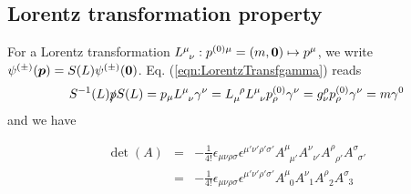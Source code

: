 \begin{comment}
\\
\tr ( \gamma^{\mu_1} \gamma^{\mu_2} \cdots \gamma^{\mu_{2n}} )
&=
2g^{\mu_1 \mu_2} \tr ( \gamma^{\mu_3} \cdots \gamma^{\mu_{2n}} )
-
\tr ( \gamma^{\mu_2} \gamma^{\mu_1}  \gamma^{\mu_3} \cdots \gamma^{\mu_{2n}} )
\\
&=
2g^{12} \tr(3 \cdots 2n) 
-
2g^{13} \tr(2\cdot 4 \cdots 2n)
+
\tr ( 2 \cdot 3 \cdot 1 \cdot 4 \cdots 2n )
\\
&\cdots
\\
&=
\sum_{i = 2}^{2n} (-1)^i 2g^{1i} \tr( 2\cdots \xcancel{i} \cdots 2n)
+(-1)^{2n -1} \tr ( 2 \cdots 2n \cdot 1)
\\
&=
\sum_{i = 2}^{2n} (-1)^i g^{\mu_1 \mu_i} 
\tr( \gamma^{\mu_2} \cdots \xcancel{\gamma^{\mu_i}} \cdots \gamma^{\mu_{2n}})

\end{comment}


\bigskip
\noindent
\subsection{Lorentz transformation property}
\label{sec:AppDirac_LorentzTransf}

For a Lorentz transformation $L^\mu_{\;\;\nu}: p^{(0)\mu} = (m, \mbox{\boldmath $0$}) \mapsto p^\mu$, we write
$\psi^{(\pm)}(\mbox{\boldmath $p$}) = S(L) \psi^{(\pm)}(\mbox{\boldmath $0$})$.
Eq. (\ref{eqn:LorentzTransfgamma}) reads
\begin{eqnarray*}
S^{-1}(L) \slashed{p} S(L)
=
p_\mu L^\mu_{\;\;\nu} \gamma^\nu
=
L_\mu^{\;\;\rho} L^\mu_{\;\;\nu} p^{(0)}_\rho \gamma^\nu
=
g^\rho_\nu p^{(0)}_\rho \gamma^\nu
=
m \gamma^0
\end{eqnarray*}
and we have

\bigskip
\begin{eqnarray}
\det(A)
&=&
- \frac{1}{4!}
\epsilon_{\mu \nu \rho \sigma}\epsilon^{\mu' \nu' \rho' \sigma'}
A^\mu_{\;\;\mu'}A^\nu_{\;\;\nu'}A^\rho_{\;\;\rho'}A^\sigma_{\;\;\sigma'}
\nonumber\\
&=&
- \frac{1}{4!}
\epsilon_{\mu \nu \rho \sigma}\epsilon^{\mu' \nu' \rho' \sigma'}
A^\mu_{\;\;0}A^\nu_{\;\;1}A^\rho_{\;\;2}A^\sigma_{\;\;3}
\end{eqnarray}

